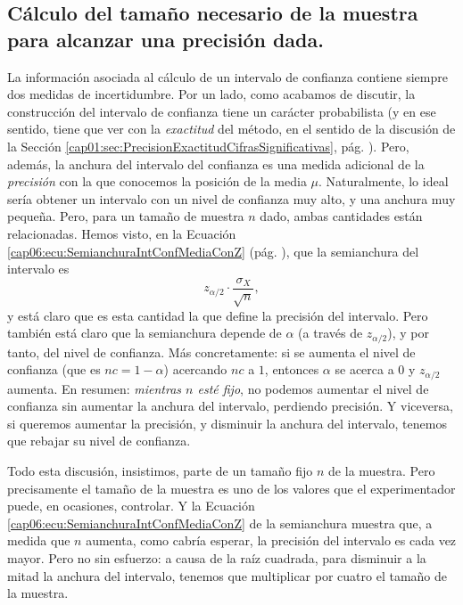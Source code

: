 \subsection{Cálculo del tamaño necesario de la muestra para alcanzar una precisión dada.}
\label{cap06:subsec:CalculoTamannoMuestra}

La información asociada al cálculo de un intervalo de confianza contiene siempre dos medidas de incertidumbre. Por un lado, como acabamos de discutir, la construcción del intervalo de confianza tiene un carácter probabilista (y en ese sentido, tiene que ver con la {\em exactitud} del método, en el sentido de la discusión de la Sección \ref{cap01:sec:PrecisionExactitudCifrasSignificativas}, pág. \pageref{cap01:sec:PrecisionExactitudCifrasSignificativas}). Pero, además, la anchura del intervalo del confianza es una medida adicional de la {\em precisión} con la que conocemos la posición de la media $\mu$. Naturalmente, lo ideal sería obtener un intervalo con un nivel de confianza muy alto, y una anchura muy pequeña. Pero, para un tamaño de muestra $n$ dado, ambas cantidades están relacionadas. Hemos visto, en la Ecuación \ref{cap06:ecu:SemianchuraIntConfMediaConZ} (pág. \pageref{cap06:ecu:SemianchuraIntConfMediaConZ}), que la semianchura del intervalo es
\[ z_{\alpha/2}\cdot\dfrac{\sigma_X}{\sqrt{n}},\]
y está claro que es esta cantidad la que define la precisión del intervalo. Pero también está claro que la semianchura depende de $\alpha$ (a través de $z_{\alpha/2}$), y por tanto, del nivel de confianza. Más concretamente: si se aumenta el nivel de confianza (que es $nc=1-\alpha$) acercando $nc$ a $1$, entonces $\alpha$ se acerca a $0$ y $z_{\alpha/2}$ aumenta. En resumen: {\em mientras $n$ esté fijo}, no podemos aumentar el nivel de confianza sin aumentar la anchura del intervalo, perdiendo precisión. Y viceversa, si queremos aumentar la precisión, y disminuir la anchura del intervalo, tenemos que rebajar su nivel de confianza.

Todo esta discusión, insistimos, parte de un tamaño fijo $n$ de la muestra. Pero precisamente el tamaño de la muestra es uno de los valores que el experimentador puede, en ocasiones, controlar. Y la Ecuación \ref{cap06:ecu:SemianchuraIntConfMediaConZ} de la semianchura muestra que, a medida que $n$ aumenta, como cabría esperar, la precisión del intervalo es cada vez mayor. Pero no sin esfuerzo: a causa de la raíz cuadrada, para disminuir a la mitad la anchura del intervalo, tenemos que multiplicar por cuatro el tamaño de la muestra.

